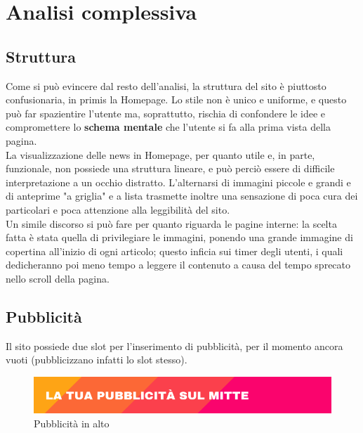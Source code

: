 \newpage
\section{Analisi complessiva}

\subsection{Struttura}
Come si può evincere dal resto dell'analisi, la struttura del sito è piuttosto confusionaria, in primis la Homepage. Lo stile non è unico e uniforme, e questo può far spazientire l'utente ma, soprattutto, rischia di confondere le idee e compromettere lo \textbf{schema mentale} che l'utente si fa alla prima vista della pagina. \\
La visualizzazione delle news in Homepage, per quanto utile e, in parte, funzionale, non possiede una struttura lineare, e può perciò essere di difficile interpretazione a un occhio distratto. L'alternarsi di immagini piccole e grandi e di anteprime "a griglia" e a lista trasmette inoltre una sensazione di poca cura dei particolari e poca attenzione alla leggibilità del sito. \\
Un simile discorso si può fare per quanto riguarda le pagine interne: la scelta fatta è stata quella di privilegiare le immagini, ponendo una grande immagine di copertina all'inizio di ogni articolo; questo inficia sui timer degli utenti, i quali dedicheranno poi meno tempo a leggere il contenuto a causa del tempo sprecato nello scroll della pagina.

\subsection{Pubblicità}
Il sito possiede due slot per l'inserimento di pubblicità, per il momento ancora vuoti (pubblicizzano infatti lo slot stesso).

\vspace{30pt}
\begin{figure}[htbp]
\begin{center}
\includegraphics[width=35em]{img/pubblicita1}
\caption{Pubblicità in alto}
\end{center}
\end{figure}
\vspace{30pt}


